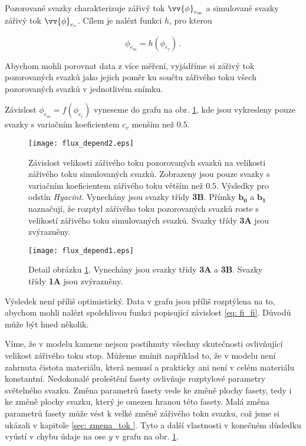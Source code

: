 	Pozorované svazky charakterizuje zářivý tok $\vv{\phi}_{e_m}$ a simulované svazky zářivý tok $\vv{\phi}_{e_r}$. Cílem je nalézt funkci $h$, pro kterou
	
	\begin{equation}	
		\phi_{e_m} = h \left( \phi_{e_r} \right) \,.
		\label{eq: fi_fi}
	\end{equation}

Abychom mohli porovnat data z více měření, vyjádříme si zářivý tok pozorovaných svazků jako jejich poměr ku součtu zářivého toku všech pozorovaných svazků v jednotlivém snímku. 

Závislost $\phi_{e_m} =  f\left( \phi_{e_r} \right)$ vyneseme do grafu na obr. \ref{fig: flux_depend2}, kde jsou vykresleny pouze svazky s variačním koeficientem $c_v$ menším než $0.5$.

\begin{figure}[htps]
\centering
\texttt{[image: flux\_depend2.eps]}
\caption[Závislost zářivého toku simulovaných a pozorovaných svazků.]{Závislost velikosti zářivého toku pozorovaných svazků na velikosti zářivého toku simulovaných svazků. Zobrazeny jsou pouze svazky s variačním koeficientem zářivého toku větším než $0.5$. Výsledky pro odstín \textit{Hyacint}. Vynechány jsou svazky třídy \textbf{3B}. Přímky $\mathbf{b_0}$ a $\mathbf{b_1}$ naznačují, že rozptyl zářivého toku pozorovaných svazků roste s velikostí zářivého toku simulovaných svazků. Svazky třídy \textbf{3A} jsou zvýrazněny.}
\label{fig: flux_depend2}
\end{figure}

\begin{figure}[htps]
\centering
\texttt{[image: flux\_depend1.eps]}
\caption[Závislost zářivého toku simulovaných a pozorovaných svazků - detail.]{Detail obrázku \ref{fig: flux_depend2}. Vynechány jsou svazky třídy \textbf{3A} a \textbf{3B}. Svazky třídy \textbf{1A} jsou zvýrazněny.}
\label{fig: flux_depend1}
\end{figure}

  Výsledek není příliš optimistický. Data v grafu jsou příliš rozptýlena na to, abychom mohli nalézt spolehlivou funkci popisující závislost \ref{eq: fi_fi}. Důvodů může být hned několik. 

Víme, že v modelu kamene nejsou postihnuty všechny skutečnosti ovlivňující velikost zářivého toku stop. Můžeme zmínit například to, že v modelu není zahrnuta čistota materiálu, která nemusí a prakticky ani není v celém materiálu konstantní. Nedokonalé proleštění fasety ovlivňuje rozptylové parametry světelného svazku. Změna parametrů fasety vede ke změně plochy fasety, tedy i ke změně plochy svazku, který je omezen hranou této fasety. Malá změna parametrů fasety může vést k velké změně zářivého toku svazku, což jsme si ukázali v kapitole \ref{sec: zmena_tok }. Tyto a další vlastnosti v konečném důsledku vyústí v chybu údaje na ose $y$ v grafu na obr. \ref{fig: flux_depend2}.

